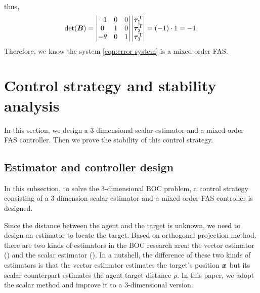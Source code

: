 \documentclass[5p,authoryear,preprint]{elsarticle}\linenofalse
\begin{document}
thus,
\[
\det(\bm B)=\begin{vmatrix}-1&0&0\\ 0&1&0\\ -\theta&0&1\end{vmatrix}
\begin{vmatrix}\bm{\tau}_1^\mathrm{T}\\ \bm{\tau}_2^\mathrm{T}\\ \bm{\tau}_3^\mathrm{T}\end{vmatrix}=(-1)\cdot1=-1.
\]
Therefore, we know the system \eqref{eqn:error system} is a mixed-order FAS.

\section{Control strategy and stability analysis}

In this section, we design a 3-dimensional scalar estimator and a mixed-order FAS controller.
Then we prove the stability of this control strategy.

\subsection{Estimator and controller design}

In this subsection, to solve the 3-dimensional BOC problem, a control strategy consisting of 
a 3-dimension scalar estimator and a mixed-order FAS controller is designed.

Since the distance between the agent and the target is unknown, we need to design an estimator to locate the target.
Based on orthogonal projection method, there are two kinds of estimators in the BOC research area: the vector estimator
(\cite{ECDeghatShamesAndersonYu2010,ECDeghatDavisSee2012,EJDeghatShamesAndersonYu2014,
	EJDeghatXiaAndersonHong2015,
	EJLiShiSong2018,EJLiShiWuSong2019,EJYangZhuChenFengGuan2020,
	EJDouSongWangLiuFeng2020,ECMaShiLiWang2021}) 
and the scalar estimator
(\cite{EJCaoLiShiSong2020,EJCaoLiShiSong2021,ECCaoDuan2023,EJWangShiLi2024}).
In a nutshell, the difference of these two kinds of estimators is that the vector estimator estimates the target's position $\bm{x}$ but its scalar counterpart estimates the agent-target distance $\rho$.
In this paper, we adopt the scalar method and improve it to a 3-dimensional version.
\end{document}
